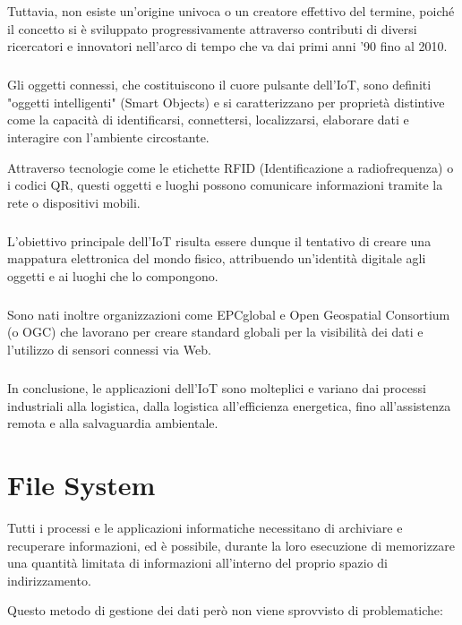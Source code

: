 \documentclass[12pt,a4paper,openright,twoside]{book}
\begin{document}
        Tuttavia, non esiste un'origine univoca o un creatore effettivo del termine, poiché il concetto si è sviluppato progressivamente attraverso contributi di diversi ricercatori e innovatori nell'arco di tempo che va dai primi anni '90 fino al 2010.

        \subparagraph*{}

        Gli oggetti connessi, che costituiscono il cuore pulsante dell’\ac{IoT}, sono definiti "oggetti intelligenti" (Smart Objects) e si caratterizzano per proprietà distintive come la capacità di identificarsi, connettersi, localizzarsi, elaborare dati e interagire con l'ambiente circostante.

        Attraverso tecnologie come le etichette RFID (Identificazione a radiofrequenza) o i codici QR, questi oggetti e luoghi possono comunicare informazioni tramite la rete o dispositivi mobili.

        \subparagraph*{}

        L'obiettivo principale dell’\ac{IoT} risulta essere dunque il tentativo di creare una mappatura elettronica del mondo fisico, attribuendo un’identità digitale agli oggetti e ai luoghi che lo compongono.

        \subparagraph*{}

        Sono nati inoltre organizzazioni come EPCglobal e Open Geospatial Consortium (o OGC) che lavorano per creare standard globali per la visibilità dei dati e l’utilizzo di sensori connessi via Web.

        \subparagraph*{}

        In conclusione, le applicazioni dell’\ac{IoT} sono molteplici e variano dai processi industriali alla logistica, dalla logistica all’efficienza energetica, fino all’assistenza remota e alla salvaguardia ambientale.

        \cite{uckelmann2011architecting}\cite{hersent2011internet}\cite{chaouchi2013internet}

    \section{File System}

        Tutti i processi e le applicazioni informatiche necessitano di archiviare e recuperare informazioni, ed è possibile, durante la loro esecuzione di memorizzare una quantità limitata di informazioni all'interno del proprio spazio di indirizzamento.

        Questo metodo di gestione dei dati però non viene sprovvisto di problematiche:
\end{document}
